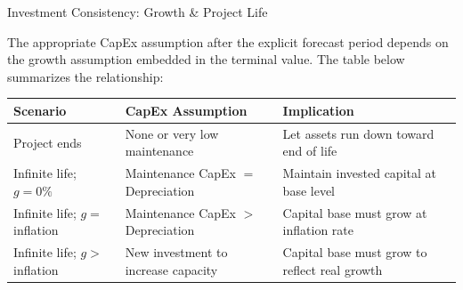 \documentclass[10pt]{article}
\begin{document}
    \begin{core}{Investment Consistency: Growth \& Project Life}

      The appropriate CapEx assumption after the explicit forecast period depends on the growth assumption embedded in the terminal value. The table below summarizes the relationship:

      \begin{center}
        \begin{tabular}{p{3cm} p{4cm} p{5.5cm}}
          \hline
          \textbf{Scenario} & \textbf{CapEx Assumption} & \textbf{Implication} \\
          \hline
          Project ends & None or very low maintenance & Let assets run down toward end of life \\
          Infinite life; $g = 0\%$ & Maintenance CapEx $=$ Depreciation & Maintain invested capital at base level \\
          Infinite life; $g =$ inflation & Maintenance CapEx $>$ Depreciation & Capital base must grow at inflation rate \\
          Infinite life; $g >$ inflation & New investment to increase capacity & Capital base must grow to reflect real growth \\
          \hline
        \end{tabular}
      \end{center}


    \end{core}
\end{document}

